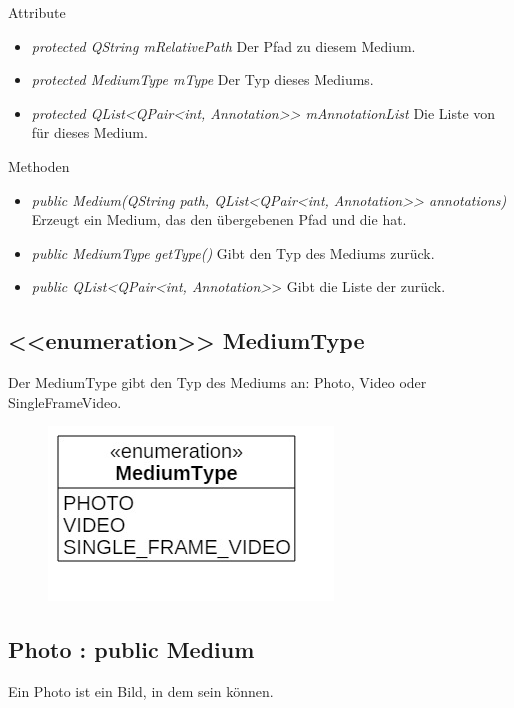 Attribute
\begin{itemize}
\item\textit{protected QString mRelativePath} Der Pfad zu diesem Medium.
\item\textit{protected MediumType mType} Der Typ dieses Mediums.
\item\textit{protected QList<QPair<int, Annotation>}\textit{> mAnnotationList} Die Liste von  für dieses Medium.
\end{itemize}

Methoden
\begin{itemize}
\item \textit{public Medium(QString path, QList<QPair<int, Annotation>}\textit{> annotations)} Erzeugt ein Medium, das den übergebenen Pfad und die  hat.
\item \textit{public MediumType getType()} Gibt den Typ des Mediums zurück.
\item \textit{public QList<QPair<int, Annotation>}> Gibt die Liste der  zurück.
\end{itemize}

\subsection*{<<enumeration>> MediumType}
Der MediumType gibt den Typ des Mediums an: Photo, Video oder SingleFrameVideo.

\begin{figure}[H]
\centering
\includegraphics[scale=0.5]{img/Klassendiagramm/Klassen/Model/MediumType}
\label{fig:mediumType}
\end{figure}

\subsection*{Photo : public Medium}
Ein Photo ist ein Bild, in dem  sein können.

